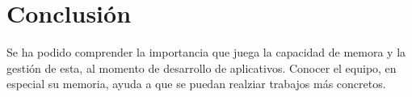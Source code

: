 \documentclass{article}
\begin{document}
    
    
  
\section{Conclusión} \label{conclulsion}
Se ha podido comprender la importancia que juega la capacidad de memora y la gestión de esta, al momento de desarrollo de aplicativos. Conocer el equipo, en especial su memoria, ayuda a que se puedan realziar trabajos más concretos.


\end{document}
